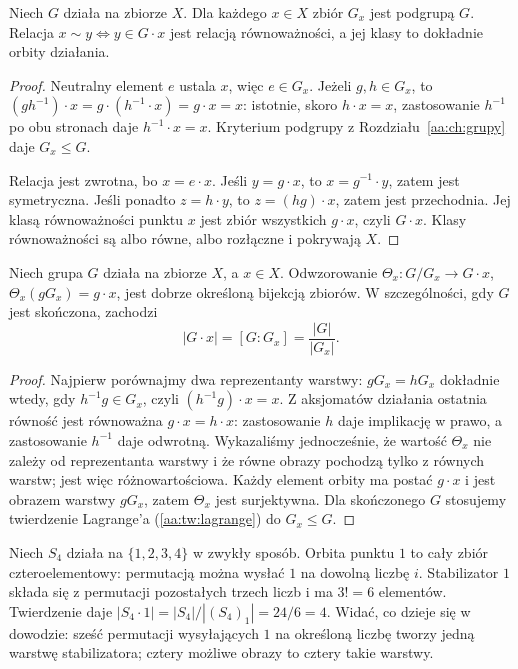 \begin{lemat}
\label{aa:lem:orbity-podzial}
Niech $G$ działa na zbiorze $X$.
Dla każdego $x\in X$ zbiór $G_x$ jest podgrupą $G$.
Relacja $x\sim y\iff y\in G\cdot x$ jest relacją równoważności,
a jej klasy to dokładnie orbity działania.
\end{lemat}
\begin{proof}
Neutralny element $e$ ustala $x$, więc $e\in G_x$.
Jeżeli $g,h\in G_x$, to
$(gh^{-1})\cdot x=g\cdot(h^{-1}\cdot x)=g\cdot x=x$:
istotnie, skoro $h\cdot x=x$, zastosowanie $h^{-1}$
po obu stronach daje $h^{-1}\cdot x=x$.
Kryterium podgrupy z Rozdziału~\ref{aa:ch:grupy} daje $G_x\le G$.

Relacja jest zwrotna, bo $x=e\cdot x$.
Jeśli $y=g\cdot x$, to $x=g^{-1}\cdot y$, zatem jest symetryczna.
Jeśli ponadto $z=h\cdot y$, to $z=(hg)\cdot x$, zatem
jest przechodnia. Jej klasą równoważności punktu $x$
jest zbiór wszystkich $g\cdot x$, czyli $G\cdot x$.
Klasy równoważności są albo równe, albo rozłączne
i pokrywają $X$.
\end{proof}

\begin{twierdzenie}
\label{aa:tw:orbita-stabilizator}
Niech grupa $G$ działa na zbiorze $X$, a $x\in X$.
Odwzorowanie
$\Theta_x:G/G_x\to G\cdot x$, $\Theta_x(gG_x)=g\cdot x$,
jest dobrze określoną bijekcją zbiorów. W szczególności,
gdy $G$ jest skończona, zachodzi
\[
 |G\cdot x|=[G:G_x]=\frac{|G|}{|G_x|}.
\]
\end{twierdzenie}
\begin{proof}
Najpierw porównajmy dwa reprezentanty warstwy:
$gG_x=hG_x$ dokładnie wtedy, gdy $h^{-1}g\in G_x$,
czyli $(h^{-1}g)\cdot x=x$.
Z aksjomatów działania ostatnia równość jest równoważna
$g\cdot x=h\cdot x$: zastosowanie $h$ daje implikację
w prawo, a zastosowanie $h^{-1}$ daje odwrotną.
Wykazaliśmy jednocześnie, że wartość $\Theta_x$
nie zależy od reprezentanta warstwy i że równe obrazy
pochodzą tylko z równych warstw; jest więc różnowartościowa.
Każdy element orbity ma postać $g\cdot x$ i jest obrazem
warstwy $gG_x$, zatem $\Theta_x$ jest surjektywna.
Dla skończonego $G$ stosujemy twierdzenie Lagrange'a
(\ref{aa:tw:lagrange}) do $G_x\le G$.
\end{proof}

\begin{przyklad}
Niech $S_4$ działa na $\{1,2,3,4\}$ w zwykły sposób.
Orbita punktu $1$ to cały zbiór czteroelementowy:
permutacją można wysłać $1$ na dowolną liczbę $i$.
Stabilizator $1$ składa się z permutacji pozostałych trzech
liczb i ma $3!=6$ elementów. Twierdzenie daje
$|S_4\cdot1|=|S_4|/|(S_4)_1|=24/6=4$.
Widać, co dzieje się w dowodzie: sześć permutacji
wysyłających $1$ na określoną liczbę tworzy jedną warstwę
stabilizatora; cztery możliwe obrazy to cztery takie warstwy.
\end{przyklad}

